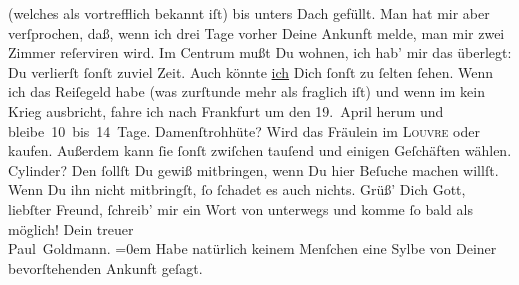 \begin{ledgroupsized}[t]{13cm}
               (welches als vortrefflich bekannt iſt) bis unters Dach gefüllt. Man hat mir aber
               verſprochen, daß, wenn ich drei Tage vorher Deine Ankunft melde, man mir zwei Zimmer
               reſerviren wird. Im Centrum
               mußt Du wohnen, ich hab’ mir das überlegt: Du verlierſt ſonſt zuviel Zeit. Auch
               könnte \uline{ich} Dich ſonſt zu ſelten ſehen.\pend
           \pstart
           {\pb}Wenn ich das Reiſegeld habe (was zurſtunde mehr als
               fraglich iſt) und wenn im \label{K_L02807-3v}\label{K_L02807-3h} kein Krieg ausbricht, fahre ich nach Frankfurt um den 19. April herum und
               bleibe 10 bis 14 Tage.\pend
           \pstart
           Damenſtrohhüte? Wird  das Fräulein im \textsc{Louvre} oder \label{K_L02807-4v}\label{K_L02807-4h} kaufen.  Außerdem kann ſie ſonſt zwiſchen
               tauſend und einigen Geſchäften wählen.\pend
           \pstart
           Cylinder? Den ſollſt Du gewiß mitbringen, wenn Du hier Beſuche machen willſt. Wenn
                  {\pb}Du ihn nicht mitbringſt, ſo ſchadet es auch
               nichts.\pend
           \pstart
           Grüß’ Dich Gott, liebſter Freund, ſchreib’ mir ein Wort \strikeout{\textcolor{gray}{×}} von unterwegs und komme ſo bald als möglich!\pend
           \pstart
           Dein treuer {\\[\baselineskip]}\spacefill\mbox{Paul Goldmann.}\pend
           \leftskip=0em{}\pstart
           \noindent{}Habe natürlich keinem Menſchen eine Sylbe von Deiner bevorſtehenden Ankunft
                  geſagt.\pend
           
         
         \endnumbering{}\end{ledgroupsized}  \newcommand{\dateiname}{L02807}\newcommand{\titel}{Paul Goldmann an Arthur Schnitzler, 4. 4. [1897]}\newcommand{\editorInnen}{Martin Anton Müller und Laura Untner}
      